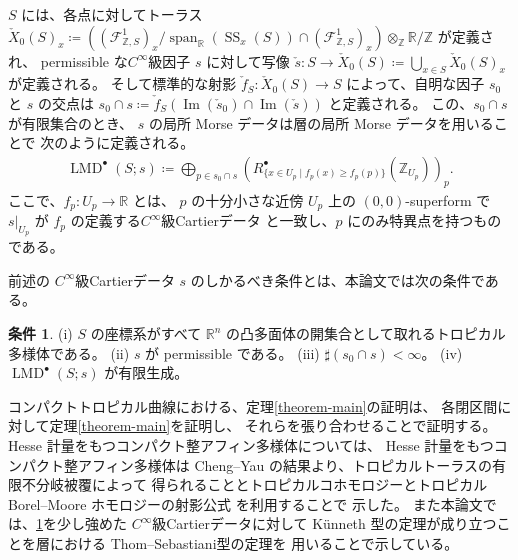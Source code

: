 \documentclass[uplatex,dvipdfmx,12pt]{jsarticle}
\numberwithin{equation}{section}
\theoremstyle{definition}
\newtheorem{condition}[theorem]{条件}
\newcommand{\deq}{\coloneqq}
\newcommand{\opn}[1]{\operatorname{#1}}
\newcommand{\aftersection}{\vspace{-8pt}}
\begin{document}
$S$ には、各点に対してトーラス
$\check{X}_0(S)_x\deq ((\mathcal{F}^{1}_{\mathbb{Z},S})_x/
\opn{span}_{\mathbb{R}}(\opn{SS}_x(S))\cap 
(\mathcal{F}^{1}_{\mathbb{Z},S})_x)\otimes_{\mathbb{Z}}
\mathbb{R}/\mathbb{Z}$ が定義され、
permissible な$C^{\infty}$級因子 $s$ に対して写像
$\check{s}\colon S\to \check{X}_0(S)\deq 
\bigcup_{x\in S} \check{X}_0(S)_x$ が定義される。 
そして標準的な射影 $\check{f}_{S}\colon \check{X}_0(S)\to S$
によって、自明な因子 $s_0$ と $s$ の交点は
$s_0\cap s\deq \check{f}_{S}(\opn{Im}(\check{s}_0)\cap 
\opn{Im}(\check{s}))$ と定義される。
この、$s_0\cap s$ が有限集合のとき、
$s$ の局所 Morse データは層の局所 Morse データを用いることで
次のように定義される。
\begin{align} \label{equation-local-morse-data}
\opn{LMD}^{\bullet}(S;s)\deq 
\bigoplus_{p\in s_0\cap s} 
(R^{\bullet}_{\{x\in U_p\mid f_p(x)\geq f_p(p)\}}(\mathbb{Z}_{U_p}))_p.
\end{align}
ここで、$f_p\colon U_p\to \mathbb{R}$ とは、
$p$ の十分小さな近傍 $U_p$ 上の $(0,0)$-superform で
$s|_{U_p}$ が $f_p$ の定義する$C^{\infty}$級Cartierデータ
と一致し、$p$ にのみ特異点を持つものである。

前述の $C^{\infty}$級Cartierデータ
$s$ のしかるべき条件とは、本論文では次の条件である。

\begin{condition} \label{condition-good}
(i) $S$ の座標系がすべて $\mathbb{R}^{n}$ 
の凸多面体の開集合として取れるトロピカル多様体である。
(ii) $s$ が permissible である。
(iii) $\sharp (s_0\cap s)<\infty$。
(iv) $\opn{LMD}^{\bullet}(S;s)$ が有限生成。
\end{condition}

コンパクトトロピカル曲線における、定理\ref{theorem-main}の証明は、
各閉区間に対して定理\ref{theorem-main}を証明し、
それらを張り合わせることで証明する。
Hesse 計量をもつコンパクト整アフィン多様体については、
Hesse 計量をもつコンパクト整アフィン多様体は Cheng--Yau
の結果\cite{MR714338}より、トロピカルトーラスの有限不分岐被覆によって
得られることとトロピカルコホモロジーとトロピカル Borel--Moore
ホモロジーの射影公式
\cite{gross2019sheaftheoretic}を利用することで
示した。
また本論文では、\cref{condition-good}を少し強めた
$C^{\infty}$級Cartierデータに対して
K\"unneth 型の定理が成り立つことを層における
Thom--Sebastiani型の定理\cite{MR2031639}を
用いることで示している。

\aftersection

{\small


}
\end{document}
